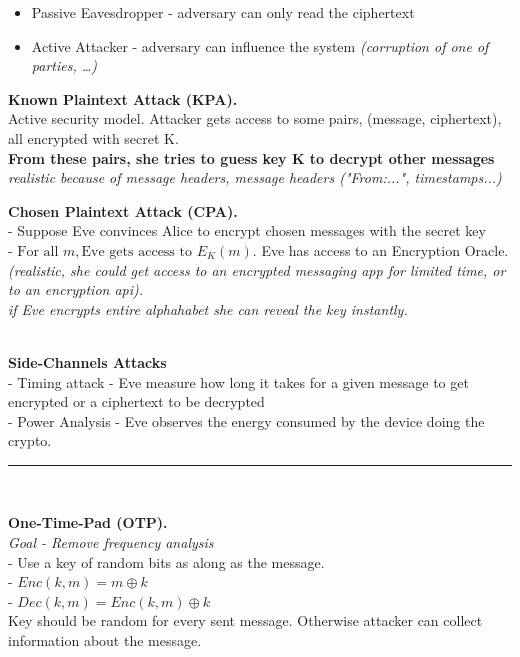\documentclass[9pt, a4paper]{extarticle}
\makeatletter
\let\oldwarning\warning
\renewcommand{\warning}{\raisebox{0.3ex}{\oldwarning}}
\renewcommand{\hline}{\noalign{\vskip 2px}\hrule\@height\arrayrulewidth\@width\linewidth\noalign{\vskip 2px}}
\makeatother
\begin{document}
\begin{minipage}[t]{0.495\textwidth}
\begin{itemize}
		\item[-] Passive Eavesdropper - adversary can only read the ciphertext
		\item[-] Active Attacker - adversary can influence the system \textit{(corruption of one of parties, \ldots)}
	\end{itemize}
	\begin{minipage}[t]{0.4\textwidth}
		\textbf{Known Plaintext Attack (KPA).}\\Active security model. Attacker gets access to some pairs, (message, ciphertext), all encrypted with secret K.\\
		\textbf{From these pairs, she tries to guess key K to decrypt other messages}\\
		\textit{realistic because of message headers, message headers ("From:...", timestamps...)}
	\end{minipage}
	\begin{minipage}[t]{0.6\textwidth}
		\textbf{Chosen Plaintext Attack (CPA).}\\
		- Suppose Eve convinces Alice to encrypt chosen messages with the secret key\\
		- $\text{For all } m, \text{Eve gets access to } E_{K}(m)$. Eve has access to an Encryption Oracle.\\
		\textit{(realistic, she could get access to an encrypted messaging app for limited time, or to an encryption api). \\
			\warning if Eve encrypts entire alphahabet she can reveal the key instantly.}
	\end{minipage}\\
	\textbf{Side-Channels Attacks}\\
	- Timing attack - Eve measure how long it takes for a given message to get encrypted or a ciphertext to be decrypted\\
	- Power Analysis - Eve observes the energy consumed by the device doing the crypto.
	\hline\\
	\begin{minipage}[t]{0.45\textwidth}
		\textbf{One-Time-Pad (OTP).}\\
		\textit{Goal - Remove frequency analysis}\\
		- Use a key of random bits as along as the message.\\
		- $Enc(k, m) = m \oplus k$\\
		- $Dec(k, m) = Enc(k, m) \oplus k$\\
		Key should be random for every sent message.
		Otherwise attacker can collect information about the message.

\end{minipage}
\end{minipage}
\end{document}
